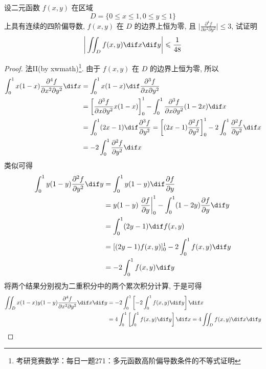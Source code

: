 \documentclass[color=green,titlestyle=hang]{elegantbook}%
\begin{document}
\begin{exercise}
设二元函数 $f(x,y)$ 在区域
\[D=\big\{0\leqslant x\leqslant1,0\leqslant y\leqslant1\big\}\]
上具有连续的四阶偏导数, $f(x,y)$ 在 $D$ 的边界上恒为零, 且 $\bigg|\frac{\partial^4f}{\partial x^2\partial y^2}\bigg|\leqslant3$, 试证明
\[\bigg|\iint_Df(x,y)\dif x\dif y\bigg|\leqslant\frac{1}{48}\]
\end{exercise}\begin{proof}
法II(by xwmath)\footnote{考研竞赛数学：每日一题271：多元函数高阶偏导数条件的不等式证明}.
由于 $f(x,y)$ 在 $D$ 的边界上恒为零, 所以
\begin{align*}
\int_0^1x(1-x)\frac{\partial^4 f}{\partial x^2\partial y^2}\dif x
&=\int_0^1x(1-x)\dif \frac{\partial^3f}{\partial x\partial y^2} \\
&=\left[\frac{\partial^3f}{\partial x \partial y^2} x(1-x)\right]_0^1-\int_0^1 \frac{\partial^3f}{\partial x \partial y^2}(1-2x)\dif x\\ 
&=\int_0^1(2 x-1)\dif \frac{\partial^3f}{\partial y^2}=\left[(2x-1) \frac{\partial^2f}{\partial y^2}\right]_0^1-2 \int_0^1\frac{\partial^2f}{\partial y^2}\dif x \\ 
&=-2\int_0^1\frac{\partial^2f}{\partial y^2}\dif x
\end{align*}
类似可得
\begin{align*}
\int_0^1y(1-y)\frac{\partial^2f}{\partial y^2}\dif  y&=\int_0^1y(1-y)\dif \frac{\partial f}{\partial y}\\
&=y(1-y)\left.\frac{\partial f}{\partial y}\bigg|_0 ^1-\int_0^1(1-2y)\frac{\partial f}{\partial y}\dif y\right.\\
&=\int_0^1(2y-1)\dif f(x, y) \\
&=[(2y-1)f(x,y)]_0^1-2\int_0^1f(x,y)\dif y \\
&=-2\int_0^1f(x,y)\dif y 
\end{align*}
将两个结果分别视为二重积分中的两个累次积分计算, 于是可得
\begin{align*} 
\iint_Dx(1-x)y(1-y)\frac{\partial^4f}{\partial x^2\partial y^2} \dif x\dif y 
&=-2\int_0^1\left[-2\int_0^1f(x,y)\dif y\right]\dif x \\
&=4\int_0^1\left[\int_0^1f(x,y)\dif y\right]\dif x=4\iint_Df(x,y)\dif x\dif y 
\end{align*}

\end{proof}
\end{document}
